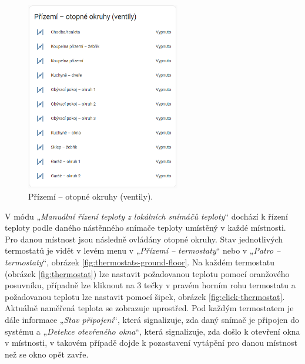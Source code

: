 \begin{Czech}
\begin{figure}[H]
    \centering
    \includegraphics[width=0.6\textwidth]{pictures/czech/software/heating-circuits-ground-floor.png}
    \caption{Přízemí – otopné okruhy (ventily).}
    \label{fig:heating-circuits-ground-floor}
\end{figure}
\end{Czech}

\begin{Czech}
\end{Czech}


\begin{Czech}
\end{Czech}

\begin{Czech}
V módu „\textit{Manuální řízení teploty z lokálních snímáčů teploty}“ dochází k řízení teploty podle daného nástěnného snímače teploty umístěný v každé místnosti. Pro danou místnost jsou následně ovládány otopné okruhy. Stav jednotlivých termostatů je vidět v levém menu v „\textit{Přízemí – termostaty}“ nebo v „\textit{Patro – termostaty}“, obrázek \ref{fig:thermostats-ground-floor}. Na každém termostatu (obrázek \ref{fig:thermostat}) lze nastavit požadovanou teplotu pomocí oranžového posuvníku, případně lze kliknout na 3 tečky v pravém horním rohu termostatu a požadovanou teplotu lze nastavit pomocí šipek, obrázek \ref{fig:click-thermostat}. Aktuálně naměřená teplota se zobrazuje uprostřed. Pod každým termostatem je dále informace „\textit{Stav připojení}“, která signalizuje, zda daný snímač je připojen do systému a „\textit{Detekce otevřeného okna}“, která signalizuje, zda došlo k otevření okna v místnosti, v takovém případě dojde k pozastavení vytápění pro danou místnost než se okno opět zavře.
\end{Czech}

